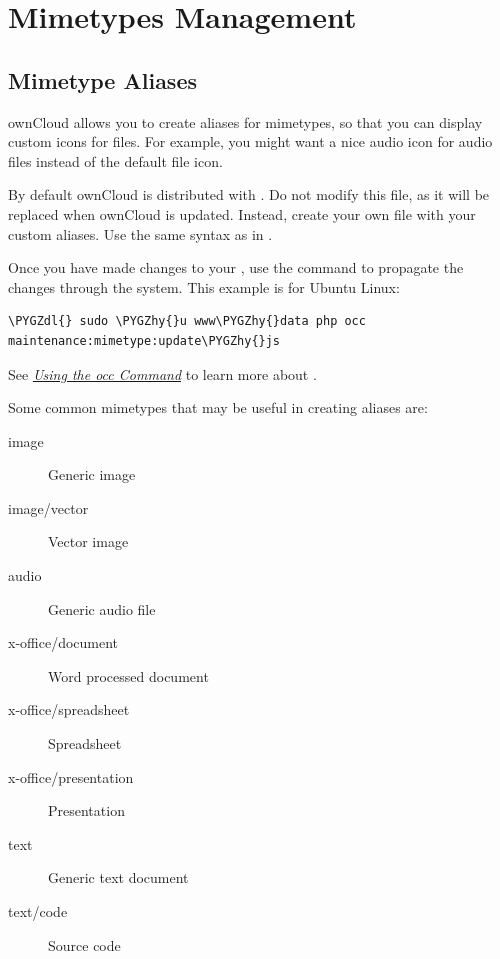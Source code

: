 \documentclass[letterpaper,10pt,english]{sphinxmanual}
\def\PYGZdl{\char`\$}
\def\PYGZhy{\char`\-}
\begin{document}
\chapter{Mimetypes Management}
\label{configuration_mimetypes/index:mimetypes-management}\label{configuration_mimetypes/index::doc}

\section{Mimetype Aliases}
\label{configuration_mimetypes/mimetype_aliases::doc}\label{configuration_mimetypes/mimetype_aliases:mimetype-aliases}
ownCloud allows you to create aliases for mimetypes, so that you can display
custom icons for files. For example, you might want a nice audio icon for audio
files instead of the default file icon.

By default ownCloud is distributed with
.
Do not modify this file, as it will be replaced when ownCloud is updated.
Instead, create your own 
file with your custom aliases. Use the same syntax as in
.

Once you have made changes to your , use the 
command to propagate the changes through the system. This example is for
Ubuntu Linux:

\begin{Verbatim}[commandchars=\\\{\}]
\PYGZdl{} sudo \PYGZhy{}u www\PYGZhy{}data php occ maintenance:mimetype:update\PYGZhy{}js
\end{Verbatim}

See {\hyperref[configuration_server/occ_command::doc]{\emph{Using the occ Command}}} to learn more about .

Some common mimetypes that may be useful in creating aliases are:
\begin{description}
\item[{image}] \leavevmode
Generic image

\item[{image/vector}] \leavevmode
Vector image

\item[{audio}] \leavevmode
Generic audio file

\item[{x-office/document}] \leavevmode
Word processed document

\item[{x-office/spreadsheet}] \leavevmode
Spreadsheet

\item[{x-office/presentation}] \leavevmode
Presentation

\item[{text}] \leavevmode
Generic text document

\item[{text/code}] \leavevmode
Source code

\end{description}
\end{document}
